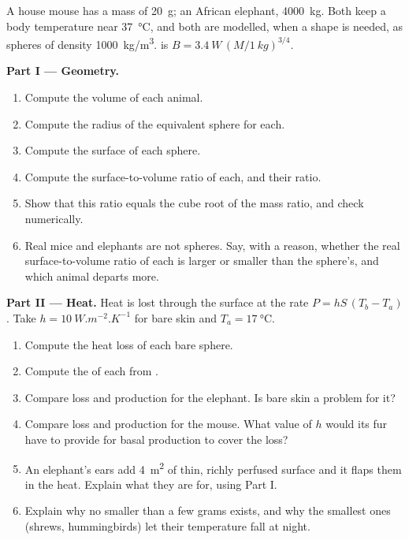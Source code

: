 \begin{problem}
\label{pb:b1:organism-environment:1}
A house mouse has a mass of \qty{20}{g}; an African elephant,
\qty{4000}{kg}. Both keep a body temperature near \qty{37}{\celsius},
and both are modelled, when a shape is needed, as spheres of density
\qty{1000}{kg/m^3}.  is $B = \qty{3.4}{W}\,(M/\qty{1}{kg})^{3/4}$.

\medskip
\noindent\textbf{Part I --- Geometry.}
\begin{enumerate}
  \item Compute the volume of each animal.
  \item Compute the radius of the equivalent sphere for each.
  \item Compute the surface of each sphere.
  \item Compute the surface-to-volume ratio of each, and their ratio.
  \item Show that this ratio equals the cube root of the mass ratio,
        and check numerically.
  \item Real mice and elephants are not spheres. Say, with a reason,
        whether the real surface-to-volume ratio of each is larger or
        smaller than the sphere's, and which animal departs more.
\end{enumerate}

\medskip
\noindent\textbf{Part II --- Heat.}
Heat is lost through the surface at the rate $P = hS\,(T_b - T_a)$.
Take $h = \qty{10}{W.m^{-2}.K^{-1}}$ for bare skin and $T_a =
\qty{17}{\celsius}$.
\begin{enumerate}[resume]
  \item Compute the heat loss of each bare sphere.
  \item Compute the  of each from .
  \item Compare loss and production for the elephant. Is bare skin a
        problem for it?
  \item Compare loss and production for the mouse. What value of $h$
        would its fur have to provide for basal production to cover
        the loss?
  \item An elephant's ears add \qty{4}{m^2} of thin, richly perfused
        surface and it flaps them in the heat. Explain what they are for,
        using Part I.
  \item Explain why no  smaller than a few grams exists, and
        why the smallest ones (shrews, hummingbirds) let their
        temperature fall at night.
\end{enumerate}


\end{problem}
